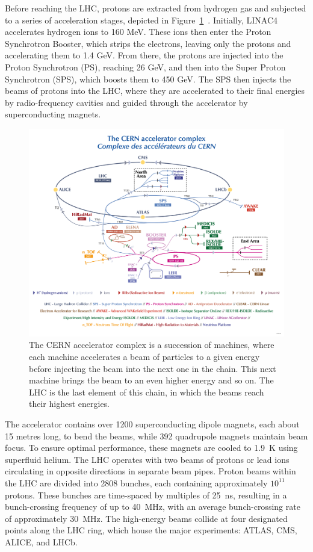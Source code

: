 Before reaching the LHC, protons are extracted from hydrogen gas and subjected to a series of acceleration stages, depicted in Figure~\ref{fig:LHC_scheme}~\cite{Lopienska:2800984}. Initially, LINAC4 accelerates hydrogen ions to 160 MeV. These ions then enter the Proton Synchrotron Booster, which strips the electrons, leaving only the protons and accelerating them to 1.4 GeV. From there, the protons are injected into the Proton Synchrotron (PS), reaching 26 GeV, and then into the Super Proton Synchrotron (SPS), which boosts them to 450 GeV. The SPS then injects the beams of protons into the LHC, where they are accelerated to their final energies by radio-frequency cavities and guided through the accelerator by superconducting magnets.
\begin{figure}[ht]
    \centering
    \includegraphics[width=\textwidth]{figures/CCC-v2022-large.png}
    \caption{The CERN accelerator complex is a succession of machines, where each machine accelerates a beam of particles to a given energy before injecting the beam into the next one in the chain. This next machine brings the beam to an even higher energy and so on. The LHC is the last element of this chain, in which the beams reach their highest energies.}
    \label{fig:LHC_scheme}
\end{figure}
The accelerator contains over 1200 superconducting dipole magnets, each about 15 metres long, to bend the beams, while 392 quadrupole magnets maintain beam focus. To ensure optimal performance, these magnets are cooled to \SI{1.9}{\kelvin} using superfluid helium. The LHC operates with two beams of protons or lead ions circulating in opposite directions in separate beam pipes. Proton beams within the LHC are divided into 2808 bunches, each containing approximately $10^{11}$ protons. These bunches are time-spaced by multiples of \SI{25}{\nano\second}, resulting in a bunch-crossing frequency of up to \SI{40}{\mega\hertz}, with an average bunch-crossing rate of approximately \SI{30}{\mega\hertz}. 
 The high-energy beams collide at four designated points along the LHC ring, which house the major experiments: ATLAS, CMS, ALICE, and LHCb.

